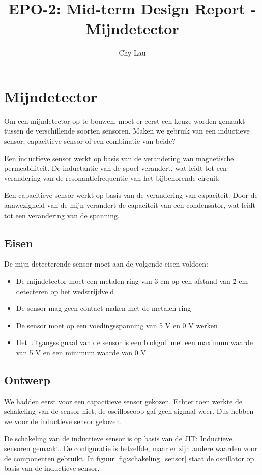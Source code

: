 \documentclass{report}
\title{EPO-2: Mid-term Design Report - Mijndetector}
\author{Chy Lau}
\begin{document}
\chapter{Mijndetector}
\label{ch:mijn}
Om een mijndetector op te bouwen, moet er eerst een keuze worden gemaakt tussen de verschillende soorten sensoren. Maken we gebruik van een inductieve sensor, capacitieve sensor of een combinatie van beide? 

Een inductieve sensor werkt op basis van de verandering van magnetische permeabiliteit. De inductantie van de spoel verandert, wat leidt tot een verandering van de resonantiefrequentie van het bijbehorende circuit.

Een capacitieve sensor werkt op basis van de verandering van capaciteit. Door de aanwezigheid van de mijn verandert de capaciteit van een condensator, wat leidt tot een verandering van de spanning. 

\section{Eisen}
\label{sec:eisen}
De mijn-detecterende sensor moet aan de volgende eisen voldoen: 
\begin{itemize}
\item De mijndetector moet een metalen ring van 3 cm \diameter op een afstand van \~2 cm detecteren op het wedstrijdveld
\item De sensor mag geen contact maken met de metalen ring
\item De sensor moet op een voedingsspanning van 5 V en 0 V werken
\item Het uitgangssignaal van de sensor is een blokgolf met een maximum waarde van 5 V en een minimum waarde van 0 V
\end{itemize}

\section{Ontwerp}
\label{sec:ontwerp}
We hadden eerst voor een capacitieve sensor gekozen. Echter toen werkte de schakeling van de sensor niet; de oscilloscoop gaf geen signaal weer. Dus hebben we voor de inductieve sensor gekozen.

De schakeling van de inductieve sensor is op basis van de JIT: Inductieve sensoren gemaakt. De configuratie is hetzelfde, maar er zijn andere waarden voor de componenten gebruikt. In figuur \ref{fig:schakeling_sensor} staat de oscillator op basis van de inductieve sensor.
\end{document}
